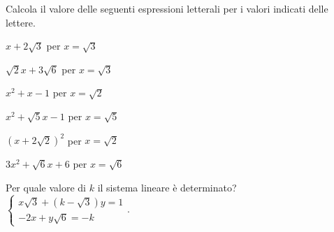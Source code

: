 \pagebreak %

\begin{esercizio}%
Calcola il valore delle seguenti espressioni letterali per i valori indicati 
delle lettere.
\begin{htmulticols}{2}
\begin{enumeratea}
\item \(x+2\sqrt 3\) per \(x=\sqrt 3\)
\item \(\sqrt 2x+3\sqrt 6\) per \(x=\sqrt{3}\)
\item \(x^2+x-1\) per \(x=\sqrt 2\)
\item \(x^2+\sqrt 5x-1\) per \(x=\sqrt 5\)
\item \((x+2\sqrt 2)^2\) per \(x=\sqrt 2\)
\item \(3x^2+\sqrt 6x +6\) per \(x=\sqrt 6\)
\end{enumeratea}
\end{htmulticols}
\end{esercizio}



\begin{esercizio}%
Per quale valore di \(k\) il sistema lineare è determinato?
\(\left\{\begin{array}{l}{x\sqrt 3+(k-\sqrt 3)y=1}\\
{-2x+y\sqrt 6=-k} \end{array}\right..\)
\end{esercizio}


